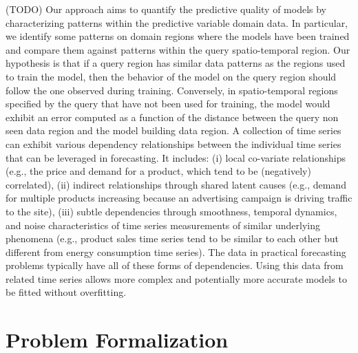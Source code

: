 (TODO) Our approach aims to quantify the predictive quality of models by characterizing patterns within the predictive variable domain data. In particular, we identify some patterns on domain regions where the models have been trained and compare them against patterns within the query spatio-temporal region. Our hypothesis is that if a query region has similar data patterns as the regions used to train the model, then the behavior of the model on the query region should follow the one observed during training.
Conversely, in spatio-temporal regions specified by the query that have not been used for training, the model would exhibit an error computed as a function of the distance between the query non seen data region and the model building data region.
A collection of time series can exhibit various dependency relationships between the individual time series that can be leveraged in forecasting. It includes:
(i) local co-variate relationships (e.g., the price and demand for a product, which tend to be (negatively) correlated),
(ii) indirect relationships through shared latent causes (e.g., demand for multiple products increasing because an advertising campaign is driving traffic to the site),
(iii) subtle dependencies through smoothness, temporal dynamics, and noise characteristics of time series measurements of similar underlying phenomena (e.g., product sales time series tend to be similar to each other but different from energy consumption time series).
The data in practical forecasting problems typically have all of these forms of dependencies. Using this data from related time series allows more complex and potentially more accurate models to be fitted without overfitting.

\section{Problem Formalization}
\label{Sec:ProblemFormalization}

